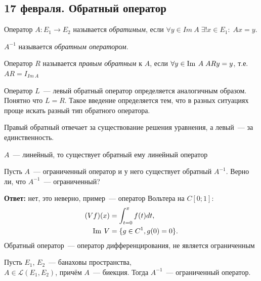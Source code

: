 \subsection{17 февраля. Обратный оператор}


\begin{definition}
    Оператор $A: E_1 \to E_2$ называется \textit{обратимым}, если $\forall y \in Im \: A \; \exists!x \in E_1: \; Ax=y.$
    
    $A^{-1}$ называется \textit{обратным оператором}.
\end{definition}

\begin{definition}
    Оператор $R$ называется \textit{правым обратным} к $A$, если $\forall y \in \operatorname{Im} \: A \; ARy=y$, т.е. $AR=I_{Im \: A}$

    Оператор $L$~--- левый обратный оператор определяется аналогичным образом. Понятно что $L = R$. Такое введение определяется тем, что в разных ситуациях проще искать разный тип обратного оператора.
\end{definition}

\begin{lemmanote}
    Правый обратный отвечает за существование решения уравнения, а левый~--- за единственность.
\end{lemmanote}

\begin{exercise}
    $A$~--- линейный, то существует обратный ему линейный оператор
\end{exercise}

\begin{exercise}
Пусть $A$~--- ограниченный оператор и у него существует обратный $A^{-1}$. Верно ли, что $A^{-1}$~--- ограниченный?

\textbf{Ответ:} нет, это неверно, пример~--- оператор Вольтера на $C[0;1]$:
\begin{align*}
    (Vf)(x) &=\int_{t=0}^x f(t)dt,\\
    \operatorname{Im} \: V &= \{ g \in C^1, g(0)=0 \}.
\end{align*}
Обратный оператор~--- оператор дифференцирования, не является ограниченным
\end{exercise}

\begin{theorem}\label{self-banah}\label{theorem8.4}
    Пусть $E_1$, $E_2$~--- банаховы пространства,\\$A \in \mathcal{L}(E_1, E_2)$, причём $A$~--- биекция. Тогда $A^{-1}$~--- ограниченный оператор.
\end{theorem}


